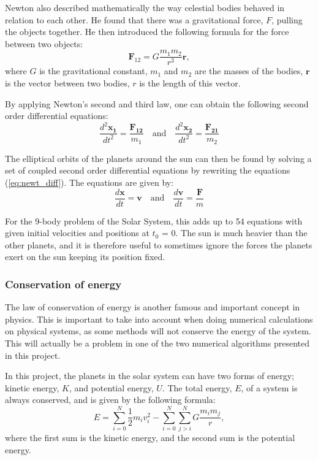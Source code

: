 \documentclass[10pt,a4paper,titlepage]{article}
\begin{document}
Newton also described mathematically the way celestial bodies behaved in relation to each other. He found that there was a gravitational force, $F$, pulling the objects together. He then introduced the following formula for the force between two objects:
\begin{equation}
\mathbf{F}_{12}=G\frac{m_{1}m_{2}}{r^3}\mathbf{r},
\end{equation}
where $G$ is the gravitational constant, $m_1$ and $m_2$ are the masses of the bodies, $\mathbf{r}$ is the vector between two bodies, $r$ is the length of this vector. 

By applying Newton's second and third law, one can obtain the following second order differential equations:
\begin{equation}
\label{eq:newt_diff}
\frac{d^2\mathbf{x_1}}{dt^2} = \frac{\mathbf{F_{12}}}{m_1} \quad \mathrm{and} \quad \frac{d^2\mathbf{x_2}}{dt^2} = \frac{\mathbf{F_{21}}}{m_2}
\end{equation}

The elliptical orbits of the planets around the sun can then be found by solving a set of coupled second order differential equations by rewriting the equations (\ref{eq:newt_diff}). The equations are given by:
\begin{equation}
\frac{d\mathbf{x}}{dt}=\mathbf{v} \quad  \mathrm{and} \quad \frac{d\mathbf{v}}{dt}=\frac{\mathbf{F}}{m}
\end{equation}

For the 9-body problem of the Solar System, this adds up to 54 equations with given initial velocities and positions at $t_0$ = 0. The sun is much heavier than the other planets, and it is therefore useful to sometimes ignore the forces the planets exert on the sun keeping its position fixed. 

\subsubsection{Conservation of energy}
The law of conservation of energy is another famous and important concept in physics. This is important to take into account when doing numerical calculations on physical systems, as some methods will not conserve the energy of the system. This will actually be a problem in one of the two numerical algorithms presented in this project. 

In this project, the planets in the solar system can have two forms of energy; kinetic energy, $K$, and potential energy, $U$. The total energy, $E$, of a system is always conserved, and is given by the following formula:
\begin{equation}
\label{eq:totalE}
E = \sum_{i=0}^{N}\frac{1}{2}m_i v_i^2-\sum_{i=0}^{N}\sum_{j>i}^{N}G\frac{m_im_j}{r},
\end{equation}
where the first sum is the kinetic energy, and the second sum is the potential energy. 
\end{document}
